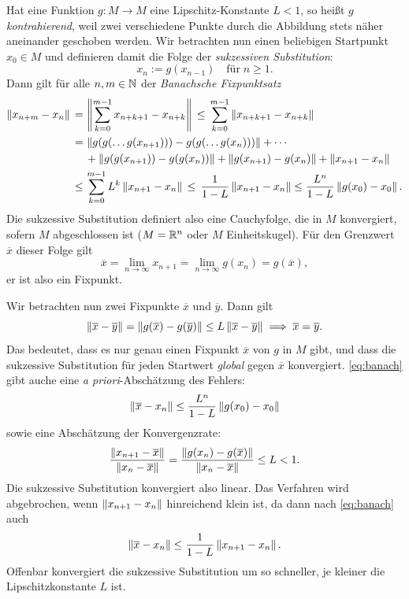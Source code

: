  Hat eine Funktion $g:M\to M$ eine
Lipschitz-Konstante $L<1$, so heißt $g$ \emph{kontrahierend}, weil
zwei verschiedene Punkte durch die Abbildung stets näher aneinander
geschoben werden. Wir betrachten nun einen beliebigen Startpunkt
$x_0\in M$ und definieren damit die Folge der \emph{sukzessiven Substitution}:
\begin{equation}
  x_{n} := g(x_{n-1}) \quad\text{für}\; n\ge 1.
\end{equation}
Dann gilt für alle $n,m\in\mathbb{N}$ der \emph{Banachsche Fixpunktsatz}
\begin{align}
  \label{eq:banach}
  \left\lVert{x_{n+m} - x_n}\right\rVert \,=\, &\left\lVert{\sum_{k=0}^{m-1} x_{n+k+1} - x_{n+k}}\right\rVert
  \,\le\, \sum_{k=0}^{m-1} \left\lVert{x_{n+k+1} - x_{n+k}}\right\rVert\nonumber\\
  \,=\, &\left\lVert{g(g(\ldots g(x_{n+1}))) - g(g(\ldots g(x_{n})))}\right\rVert
  + \cdots\nonumber\\
  &+ \left\lVert{g(g(x_{n+1})) - g(g(x_{n}))}\right\rVert
  + \left\lVert{g(x_{n+1}) - g(x_{n})}\right\rVert + \left\lVert{x_{n+1} - x_{n}}\right\rVert\nonumber\\
  \le\, &\sum_{k=0}^{m-1} L^k \left\lVert{x_{n+1} - x_{n}}\right\rVert
  \,\le\, \frac{1}{1-L}\left\lVert{x_{n+1} - x_{n}}\right\rVert \le
  \frac{L^n}{1-L}\left\lVert{g(x_0) - x_0}\right\rVert.
\end{align}
Die sukzessive Substitution definiert also eine Cauchyfolge, die in
$M$ konvergiert, sofern $M$ abgeschlossen ist (\zb $M=\mathbb{R}^n$ oder $M$
Einheitskugel). Für den Grenzwert $\overline{x}$ dieser Folge gilt
\begin{equation}
  \overline{x} = \lim_{n\to\infty}x_{n+1} = \lim_{n\to\infty}g(x_{n})
  = g(\overline{x}),
\end{equation}
er ist also ein Fixpunkt.

Wir betrachten nun zwei Fixpunkte $\overline{x}$ und $\overline{y}$. Dann gilt
\begin{equation}
  \left\lVert{\overline{x} - \overline{y}}\right\rVert = \left\lVert{g(\overline{x}) -
    g(\overline{y})}\right\rVert \le L \left\lVert{\overline{x} - \overline{y}}\right\rVert \implies
  \overline{x} = \overline{y}.
\end{equation}
Das bedeutet, dass es nur genau einen Fixpunkt $\overline{x}$ von $g$
in $M$ gibt, und dass die sukzessive Substitution für jeden Startwert
\emph{global} gegen $\overline{x}$ konvergiert. \eqref{eq:banach}
gibt auche eine \textit{a priori}-Abschätzung des Fehlers:
\begin{equation}
  \left\lVert{\overline{x} - x_n}\right\rVert \le \frac{L^n}{1-L}\left\lVert{g(x_0) - x_0}\right\rVert
\end{equation}
sowie eine Abschätzung der Konvergenzrate:
\begin{equation}
  \frac{\left\lVert{x_{n+1} - \overline{x}}\right\rVert}{\left\lVert{x_n - \overline{x}}\right\rVert}
  = \frac{\left\lVert{g(x_n) - g(\overline{x})}\right\rVert}{\left\lVert{x_n - \overline{x}}\right\rVert}
  \le L < 1.
\end{equation}
Die sukzessive Substitution konvergiert also linear. Das Verfahren
wird abgebrochen, wenn $\left\lVert{x_{n+1} - x_n}\right\rVert$ hinreichend klein ist,
da dann nach \eqref{eq:banach} auch
\begin{equation}
  \left\lVert{\overline{x} - x_n}\right\rVert \le \frac{1}{1-L}\left\lVert{x_{n+1} - x_n}\right\rVert.
\end{equation}
Offenbar konvergiert die sukzessive Substitution um so schneller, je
kleiner die Lipschitzkonstante $L$ ist.

